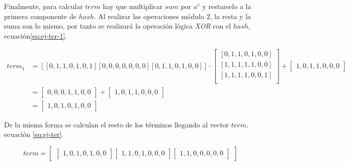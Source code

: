Finalmente, para calcular $term$ hay que multiplicar $sum$ por $a^v$ y restarselo a la primera componente de $hash$. Al realizar las operaciones módulo $2$, la resta y la suma son lo mismo, por tanto se realizará la operación lógica \textit{XOR} con el $hash$, ecuación\ref{eq:ej-ter-1}.

\begin{equation}\label{eq:ej-ter-1}
	\begin{split}
	{term_1} &= 
		\left[\left[0, 1, 1, 0, 1, 0, 1\right]			
		\left[0, 0, 0, 0, 0, 0, 0\right]
		\left[0, 1, 1, 0, 1, 0, 0\right]\right] \cdot 
		\left[\begin{array}{c}
			\left[0, 1, 1, 0, 1, 0, 0\right]\\
			\left[1, 1, 1, 1, 1, 0, 0\right]\\
			\left[1, 1, 1, 1, 0, 0, 1\right]\\
		\end{array}\right]
		+ \left[\begin{array}{c}1, 0, 1, 1, 0, 0, 0\end{array}\right]\\
		&= \left[\begin{array}{c}0, 0, 0, 1, 1, 0, 0\end{array}\right] + 
		\left[\begin{array}{c}1, 0, 1, 1, 0, 0, 0\end{array}\right]\\
		& = \left[\begin{array}{c}1, 0, 1, 0, 1, 0, 0\end{array}\right]
	\end{split}
\end{equation}

De la misma forma se calculan el resto de los términos llegando al vector $term$, ecuación \ref{eq:ej-ter}.

\begin{equation}\label{eq:ej-ter}
	{term} = 
		\left[\begin{array}{c}
			\left[\begin{array}{c}1, 0, 1, 0, 1, 0, 0\end{array}\right]			
			\left[\begin{array}{c}1, 1, 0, 1, 0, 0, 0\end{array}\right]
			\left[\begin{array}{c}1, 1, 0, 0, 0, 0, 0\end{array}\right]
		\end{array}\right]
\end{equation}

